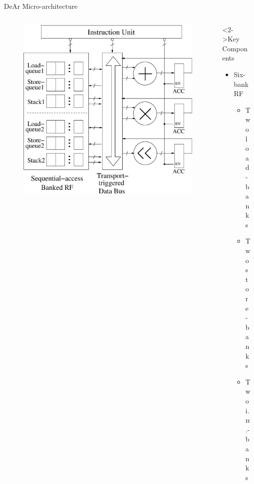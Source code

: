 \documentclass{beamer}
\begin{document}
\begin{CJK}{UTF8}{bkai}
            \begin{frame}{DeAr Micro-architecture}
                \begin{columns}
                    \begin{column}{0.6\textwidth}
                        \begin{figure}[!ht] 
                            \centering
                            \includegraphics[width=1.0\textwidth]{./figs/micro.eps}
                        \end{figure}
                    \end{column}
                    \begin{column}{0.35\textwidth}
                        \begin{block}<2->{Key Components}
                            \begin{itemize}
                                \item <3->
                                {
                                    Six-bank RF
                                    \begin{itemize}
                                        \item Two load-banks
                                        \item Two store-banks
                                        \item Two i.m.-banks

\end{itemize}}
\end{itemize}
\end{block}
\end{column}
\end{columns}
\end{frame}
\end{CJK}
\end{document}
